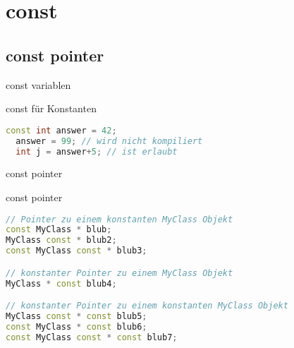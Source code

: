 \section{const}
\subsection{const pointer}
\begin{frame}[fragile]{const variablen}

\begin{block}{const für Konstanten}
	\begin{lstlisting}[language=C++]
  const int answer = 42;
  answer = 99; // wird nicht kompiliert
  int j = answer+5; // ist erlaubt
	\end{lstlisting}
\end{block}

\end{frame}

\begin{frame}[fragile]{const pointer}

\begin{block}{const pointer}
\begin{small}
	\begin{lstlisting}[language=C++]
// Pointer zu einem konstanten MyClass Objekt
const MyClass * blub;
MyClass const * blub2;
const MyClass const * blub3;

// konstanter Pointer zu einem MyClass Objekt
MyClass * const blub4;

// konstanter Pointer zu einem konstanten MyClass Objekt
MyClass const * const blub5; 
const MyClass * const blub6; 
const MyClass const * const blub7;
	\end{lstlisting}
	\end{small}
\end{block}

\end{frame}

